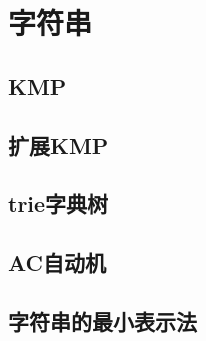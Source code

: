\section{字符串}
\subsection{KMP}


\subsection{扩展KMP}


\subsection{trie字典树}


\subsection{AC自动机}




\subsection{字符串的最小表示法}

